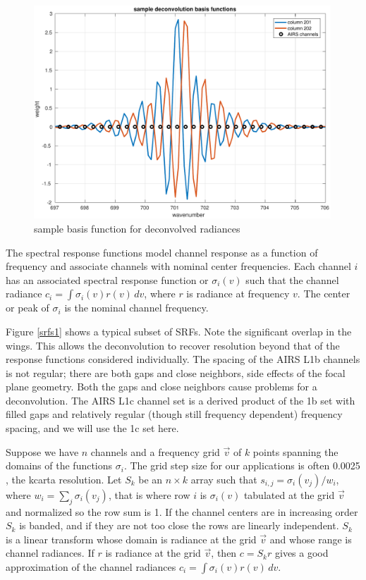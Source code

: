 \documentclass[12pt]{article}
\begin{document}
\begin{figure}
  \centering
  \includegraphics[height=8cm]{figures/airs_decon_basis.pdf}
  \caption{sample basis function for deconvolved {\airs} radiances}
  \label{dbasis}
\end{figure}

The {\airs} spectral response functions model channel response as a
function of frequency and associate channels with nominal center
frequencies.  Each {\airs} channel $i$ has an associated spectral
response function or {\srf} $\sigma_i(v)$ such that the channel
radiance $c_i = \int \sigma_i(v)r(v)\,dv$, where $r$ is radiance at
frequency $v$.  The center or peak of $\sigma_i$ is the nominal
channel frequency.

Figure \ref{srfs1} shows a typical subset of {\airs} SRFs.  Note the
significant overlap in the wings.  This allows the deconvolution to
recover resolution beyond that of the response functions considered
individually.  The spacing of the AIRS L1b channels is not regular;
there are both gaps and close neighbors, side effects of the focal
plane geometry.  Both the gaps and close neighbors cause problems for
a deconvolution.  The AIRS L1c channel set \cite{airs1c} is a derived
product of the 1b set with filled gaps and relatively regular (though
still frequency dependent) frequency spacing, and we will use the 1c
set here.

Suppose we have $n$ channels and a frequency grid $\vec v$ of $k$
points spanning the domains of the functions $\sigma_i$.  The grid
step size for our applications is often 0.0025 {\wn}, the kcarta
resolution.  Let $S_k$ be an $n\times k$ array such that $s_{i,j} =
\sigma_i(v_j)/w_i$, where $w_i = \sum_j \sigma_i(v_j)$, that is
where row $i$ is $\sigma_i(v)$ tabulated at the grid $\vec v$ and
normalized so the row sum is 1.  If the channel centers are in
increasing order $S_k$ is banded, and if they are not too close the
rows are linearly independent.  $S_k$ is a linear transform whose
domain is radiance at the grid $\vec v$ and whose range is channel
radiances.  If $r$ is radiance at the grid $\vec v$, then $c = S_k r$
gives a good approximation of the channel radiances $c_i = 
\int\sigma_i(v)r(v)\,dv$.
\end{document}
